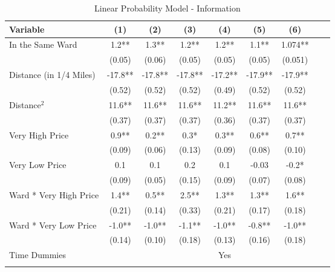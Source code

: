 \documentclass[12pt]{article}
\newcommand{\se}[1]{\footnotesize{(#1)}}
\begin{document}
\begin{sidewaystable}[ht]
\centering
\caption{Linear Probability Model - Information}

\begin{tabular}{@{}lcccccccc@{}} \toprule
Variable                                 & (1)       & (2)       & (3)       & (4)       & (5)       & (6)   \\\midrule
\multirow{2}{*}{In the Same Ward}        & 1.2**     & 1.3**     & 1.2**     & 1.2**     & 1.1**     & 1.074**\\
                                         & \se{0.05} & \se{0.06} & \se{0.05} & \se{0.05} & \se{0.05} & \se{0.051}\\
\multirow{2}{*}{Distance (in 1/4 Miles)} & -17.8**   & -17.8**   & -17.8**   & -17.2**   & -17.9**   & -17.9**\\
                                         & \se{0.52} & \se{0.52} & \se{0.52} & \se{0.49} & \se{0.52} & \se{0.52}\\
\multirow{2}{*}{Distance$^2$ }           & 11.6**    & 11.6**    & 11.6**    & 11.2**    & 11.6**    & 11.6**\\
                                         & \se{0.37} & \se{0.37} & \se{0.37} & \se{0.36} & \se{0.37} & \se{0.37}\\
\multirow{2}{*}{Very High Price}         & 0.9**     & 0.2**     & 0.3*      & 0.3**     & 0.6**     & 0.7**\\
                                         & \se{0.09} & \se{0.06} & \se{0.13} & \se{0.09} & \se{0.08} & \se{0.10}\\
\multirow{2}{*}{Very Low Price}          & 0.1       & 0.1       & 0.2       & 0.1       & -0.03     & -0.2*\\
                                         & \se{0.09} & \se{0.05} & \se{0.15} & \se{0.09} & \se{0.07} & \se{0.08}\\
\multirow{2}{*}{Ward * Very High Price}  & 1.4**     & 0.5**     & 2.5**     & 1.3**     & 1.3**     & 1.6**\\
                                         & \se{0.21} & \se{0.14} & \se{0.33} & \se{0.21} & \se{0.17} & \se{0.18} \\
\multirow{2}{*}{Ward * Very Low Price }  & -1.0**    & -1.0**    & -1.1**    & -1.0**    & -0.8**    & -1.0**\\
                                         & \se{0.14} & \se{0.10} & \se{0.18} & \se{0.13} & \se{0.16} & \se{0.18}\\\addlinespace
Time Dummies            &           &           &           & Yes       &           &\\\addlinespace

\end{tabular}
\end{sidewaystable}
\end{document}
